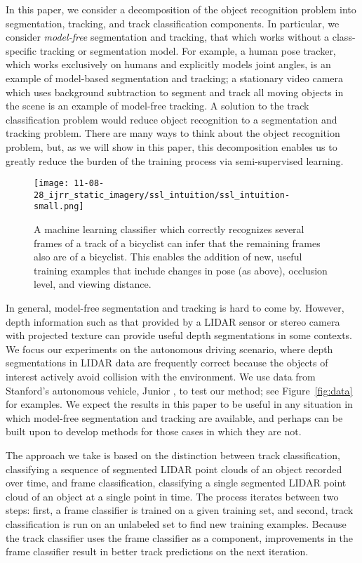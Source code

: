 \documentclass[conference]{IEEEtran}
\begin{document}
In this paper, we consider a decomposition of the object recognition problem into segmentation, tracking, and track classification components.  In particular, we consider \emph{model-free} segmentation and tracking, \ie that which works without a class-specific tracking or segmentation model.  For example, a human pose tracker, which works exclusively on humans and explicitly models joint angles, is an example of model-based segmentation and tracking; a stationary video camera which uses background subtraction to segment and track all moving objects in the scene is an example of model-free tracking.  A solution to the track classification problem would reduce object recognition to a segmentation and tracking problem.  There are many ways to think about the object recognition problem, but, as we will show in this paper, this decomposition enables us to greatly reduce the burden of the training process via semi-supervised learning.


\begin{figure}
  \centering
  \texttt{[image: 11-08-28\_ijrr\_static\_imagery/ssl\_intuition/ssl\_intuition-small.png]}
  \caption{A machine learning classifier which correctly recognizes several frames of a track of a bicyclist can infer that the remaining frames also are of a bicyclist.  This enables the addition of new, useful training examples that include changes in pose (as above), occlusion level, and viewing distance.}
  \label{fig:ssl_intuition}
\end{figure}


In general, model-free segmentation and tracking is hard to come by.  However, depth information such as that provided by a LIDAR sensor or stereo camera with projected texture can provide useful depth segmentations in some contexts.  We focus our experiments on the autonomous driving scenario, where depth segmentations in LIDAR data are frequently correct because the objects of interest actively avoid collision with the environment.  We use data from Stanford's autonomous vehicle, Junior \citep{Montemerlo2008}, to test our method; see Figure~\ref{fig:data} for examples.  We expect the results in this paper to be useful in any situation in which model-free segmentation and tracking are available, and perhaps can be built upon to develop methods for those cases in which they are not.

The approach we take is based on the distinction between track classification, \ie classifying a sequence of segmented LIDAR point clouds of an object recorded over time, and frame classification, \ie classifying a single segmented LIDAR point cloud of an object at a single point in time.  The process iterates between two steps: first, a frame classifier is trained on a given training set, and second, track classification is run on an unlabeled set to find new training examples.  Because the track classifier uses the frame classifier as a component, improvements in the frame classifier result in better track predictions on the next iteration.
\end{document}

